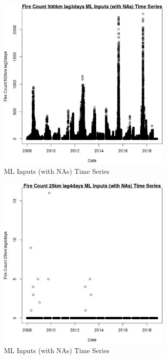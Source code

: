 \begin{figure} 
\centering  
\includegraphics[width=0.77\textwidth]{Code_Outputs/Report_ML_input_PM25_Step4_part_e_de_duplicated_aves_compiled_2019-05-20wNAs_Fire_Count_500km_lag3daysvDate.jpg} 
\caption{\label{fig:Report_ML_input_PM25_Step4_part_e_de_duplicated_aves_compiled_2019-05-20wNAsFire_Count_500km_lag3daysvDate}ML Inputs (with NAs) Time Series} 
\end{figure} 
 

\begin{figure} 
\centering  
\includegraphics[width=0.77\textwidth]{Code_Outputs/Report_ML_input_PM25_Step4_part_e_de_duplicated_aves_compiled_2019-05-20wNAs_Fire_Count_25km_lag4daysvDate.jpg} 
\caption{\label{fig:Report_ML_input_PM25_Step4_part_e_de_duplicated_aves_compiled_2019-05-20wNAsFire_Count_25km_lag4daysvDate}ML Inputs (with NAs) Time Series} 
\end{figure} 
 

